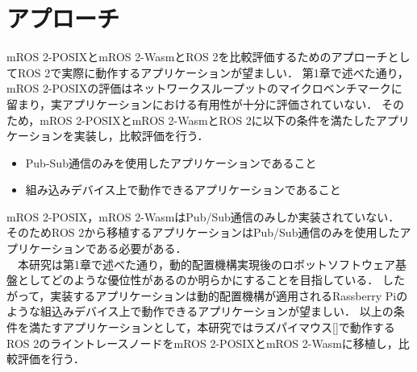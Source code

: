 \chapter{アプローチ}
\label{chap:aproach}
mROS 2-POSIXとmROS 2-WasmとROS 2を比較評価するためのアプローチとしてROS 2で実際に動作するアプリケーションが望ましい．
第1章で述べた通り，mROS 2-POSIXの評価はネットワークスループットのマイクロベンチマークに留まり，実アプリケーションにおける有用性が十分に評価されていない．
そのため，mROS 2-POSIXとmROS 2-WasmとROS 2に以下の条件を満たしたアプリケーションを実装し，比較評価を行う．
\begin{itemize}
    \item Pub-Sub通信のみを使用したアプリケーションであること
    \item 組み込みデバイス上で動作できるアプリケーションであること
\end{itemize}
mROS 2-POSIX，mROS 2-WasmはPub/Sub通信のみしか実装されていない．
そのためROS 2から移植するアプリケーションはPub/Sub通信のみを使用したアプリケーションである必要がある．
\\　本研究は第1章で述べた通り，動的配置機構実現後のロボットソフトウェア基盤としてどのような優位性があるのか明らかにすることを目指している．
したがって，実装するアプリケーションは動的配置機構が適用されるRassberry Piのような組込みデバイス上で動作できるアプリケーションが望ましい．
以上の条件を満たすアプリケーションとして，本研究ではラズパイマウス[]で動作するROS 2のライントレースノードをmROS 2-POSIXとmROS 2-Wasmに移植し，比較評価を行う．
